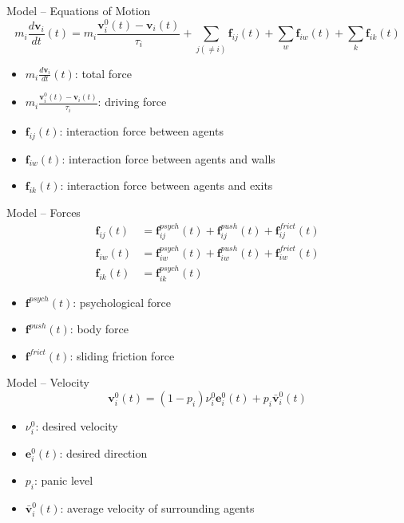 \documentclass[aspectratio=43]{beamer}
\begin{document}
\begin{frame}{Model -- Equations of Motion}
	\begin{equation*}
		m_i \frac{d\bm{v}_i}{dt}(t) = m_i \frac{\bm{v}_i^0(t) -\bm{v}_i(t)}{\tau_i} + \sum_{j(\neq i)}^{}\bm{f}_{ij}(t) + \sum_{w}^{}\bm{f}_{iw}(t) + \sum_{k}^{}\bm{f}_{ik}(t)
	\end{equation*}
	
	\vfill
	
	\begin{itemize}
		\item $m_i \frac{d\bm{v}_i}{dt}(t)$: total force
		\smallskip
		\item $ m_i \frac{\bm{v}_i^0(t) -\bm{v}_i(t)}{\tau_i}$: driving force
		\smallskip
		\item $\bm{f}_{ij}(t)$: interaction force between agents
		\smallskip
		\item $\bm{f}_{iw}(t)$: interaction force between agents and walls
		\smallskip
		\item $\bm{f}_{ik}(t)$: interaction force between agents and exits
	\end{itemize}
\end{frame}


\begin{frame}{Model -- Forces}
	\begin{equation*}
	\begin{split}
		\bm{f}_{ij}(t) & = \bm{f}_{ij}^{psych}(t) + \bm{f}_{ij}^{push}(t) + \bm{f}_{ij}^{frict}(t) \\[0.5em]
		\bm{f}_{iw}(t) & = \bm{f}_{iw}^{psych}(t) + \bm{f}_{iw}^{push}(t) + \bm{f}_{iw}^{frict}(t) \\[0.5em]
		\bm{f}_{ik}(t) & =\bm{f}_{ik}^{psych}(t)
	\end{split}
	\end{equation*}
	
	\vfill
	
	\begin{itemize}
		\item $\bm{f}^{psych}(t)$: psychological force
		\smallskip
		\item $\bm{f}^{push}(t)$: body force
		\smallskip
		\item $\bm{f}^{frict}(t)$: sliding friction force
	\end{itemize}
\end{frame}


\begin{frame}{Model -- Velocity}
	\begin{equation*}
		\bm{v}_i^0(t) = (1-p_i) \nu_i^0 \bm{e}_i^0(t) + p_i \bar{\bm{v}}_i^0(t)
	\end{equation*}
	
	\vfill
	
	\begin{itemize}
		\item $\nu_i^0$: desired velocity
		\smallskip
		\item $\bm{e}_i^0(t)$: desired direction
		\smallskip
		\item $p_i$: panic level
		\smallskip
		\item $\bar{\bm{v}}_i^0(t)$: average velocity of surrounding agents
	\end{itemize}
\end{frame}
\end{document}
